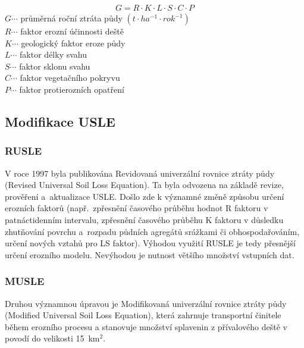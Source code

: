 \begin{align}
   \label{usle1978} G=R\cdot K\cdot L\cdot S\cdot C\cdot P
\end{align}
\hspace*{2cm}$G \cdots$ průměrná roční ztráta půdy $\left( t\cdot
ha^{-1}\cdot rok^{-1} \right)$\\
\hspace*{2cm}$R \cdots$ faktor erozní účinnosti deště \\
\hspace*{2cm}$K \cdots$ geologický faktor eroze půdy \\
\hspace*{2cm}$L \cdots$ faktor délky svahu \\
\hspace*{2cm}$S \cdots$ faktor sklonu svahu \\
\hspace*{2cm}$C \cdots$ faktor vegetačního pokryvu \\
\hspace*{2cm}$P \cdots$ faktor protierozních opatření \\

\subsection{Modifikace USLE}
\subsubsection{RUSLE}
V roce 1997 byla publikována Revidovaná univerzální rovnice ztráty
půdy (Revised Universal Soil Loss Equation). Ta byla odvozena na
základě revize, prověření a~aktualizace USLE. Došlo
zde k významné změně způsobu určení erozních faktorů (např.~zpřesnění
časového průběhu hodnot R faktoru v patnáctidenním intervalu,
zpřesnění časového průběhu K faktoru v důsledku zhutňování povrchu a~rozpadu půdních agregátů srážkami či obhospodařováním, určení nových vztahů pro
LS faktor). Výhodou využití RUSLE je tedy přesnější určení
erozního modelu. Nevýhodou je nutnost většího množství vstupních
dat.\cite{rusle1997}
\subsubsection{MUSLE}
Druhou významnou úpravou je Modifikovaná univerzální rovnice ztráty
půdy (Modified Universal Soil Loss Equation), která zahrnuje
transportní činitele během erozního procesu a stanovuje množství
splavenin z přívalového deště v povodí do velikosti
15~km$^{2}$.\cite{musle1945}

